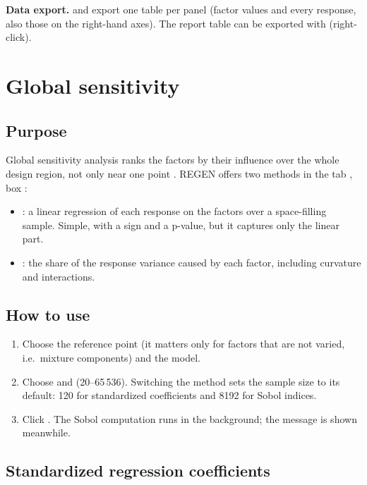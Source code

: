 \textbf{Data export.}  and  export one table per panel (factor values and every
response, also those on the right-hand axes). The report table can be exported with 
(right-click).

\section{Global sensitivity}
\label{sec:ch09-global}

\subsection{Purpose}
Global sensitivity analysis ranks the factors by their influence over the whole design region, not only near one
point \citep{saltelli2008}. REGEN offers two methods in the tab , box :
\begin{itemize}
  \item {}: a linear regression of each response on the factors over a
        space-filling sample. Simple, with a sign and a p-value, but it captures only the linear part.
  \item {}: the share of the response variance caused by each factor, including
        curvature and interactions.
\end{itemize}

\subsection{How to use}
\begin{enumerate}
  \item Choose the reference point (it matters only for factors that are not varied, i.e.\ mixture components) and
        the model.
  \item Choose  and  (20--65\,536). Switching the method sets the sample size to its
        default: 120 for standardized coefficients and 8192 for Sobol indices.
  \item Click . The Sobol computation runs in the background; the message 
        is shown meanwhile.
\end{enumerate}

\subsection{Standardized regression coefficients}
